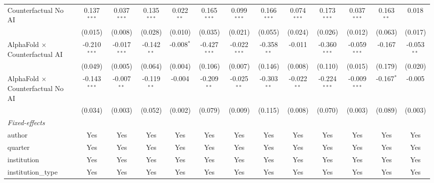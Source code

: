 \begin{tabular}{lcccccccccccc}
   Counterfactual No AI                     & 0.137$^{***}$  & 0.037$^{***}$  & 0.135$^{***}$ & 0.022$^{**}$ & 0.165$^{***}$  & 0.099$^{***}$  & 0.166$^{***}$ & 0.074$^{***}$ & 0.173$^{***}$  & 0.037$^{***}$  & 0.163$^{**}$ & 0.018\\   
                                            & (0.015)        & (0.008)        & (0.028)       & (0.010)      & (0.035)        & (0.021)        & (0.055)       & (0.024)       & (0.026)        & (0.012)        & (0.063)      & (0.017)\\   
   AlphaFold $\times$ Counterfactual AI     & -0.210$^{***}$ & -0.017$^{***}$ & -0.142$^{**}$ & -0.008$^{*}$ & -0.427$^{***}$ & -0.022$^{***}$ & -0.358$^{**}$ & -0.011        & -0.360$^{***}$ & -0.059$^{***}$ & -0.167       & -0.053$^{**}$\\   
                                            & (0.049)        & (0.005)        & (0.064)       & (0.004)      & (0.106)        & (0.007)        & (0.146)       & (0.008)       & (0.110)        & (0.015)        & (0.179)      & (0.020)\\   
   AlphaFold $\times$ Counterfactual No AI  & -0.143$^{***}$ & -0.007$^{**}$  & -0.119$^{**}$ & -0.004       & -0.209$^{**}$  & -0.025$^{**}$  & -0.303$^{**}$ & -0.022$^{**}$ & -0.224$^{***}$ & -0.009$^{***}$ & -0.167$^{*}$ & -0.005\\   
                                            & (0.034)        & (0.003)        & (0.052)       & (0.002)      & (0.079)        & (0.009)        & (0.115)       & (0.008)       & (0.070)        & (0.003)        & (0.089)      & (0.003)\\   
   \midrule
   \emph{Fixed-effects}\\
   author                                   & Yes            & Yes            & Yes           & Yes          & Yes            & Yes            & Yes           & Yes           & Yes            & Yes            & Yes          & Yes\\  
   quarter                                  & Yes            & Yes            & Yes           & Yes          & Yes            & Yes            & Yes           & Yes           & Yes            & Yes            & Yes          & Yes\\  
   institution                              & Yes            & Yes            & Yes           & Yes          & Yes            & Yes            & Yes           & Yes           & Yes            & Yes            & Yes          & Yes\\  
   institution\_type                        & Yes            & Yes            & Yes           & Yes          & Yes            & Yes            & Yes           & Yes           & Yes            & Yes            & Yes          & Yes\\  

\end{tabular}
